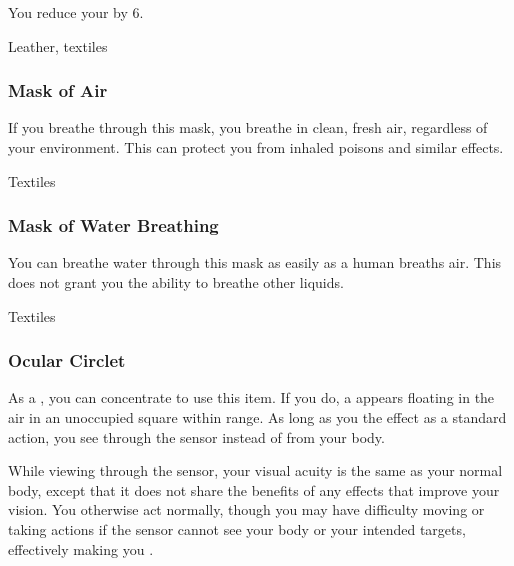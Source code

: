 You reduce your  by 6.



 


 Leather, textiles


\lowercase{\hypertarget{item:Mask of Air}{}}\label{item:Mask of Air}
\hypertarget{item:Mask of Air}{\subsubsection{Mask of Air\hfill{}}}

If you breathe through this mask, you breathe in clean, fresh air, regardless of your environment.
This can protect you from inhaled poisons and similar effects.



 Textiles


\lowercase{\hypertarget{item:Mask of Water Breathing}{}}\label{item:Mask of Water Breathing}
\hypertarget{item:Mask of Water Breathing}{\subsubsection{Mask of Water Breathing\hfill{}}}

You can breathe water through this mask as easily as a human breaths air.
This does not grant you the ability to breathe other liquids.



 Textiles


\lowercase{\hypertarget{item:Ocular Circlet}{}}\label{item:Ocular Circlet}
\hypertarget{item:Ocular Circlet}{\subsubsection{Ocular Circlet\hfill{}}}

As a , you can concentrate to use this item.
If you do, a  appears floating in the air in an unoccupied square within \rngclose range.
As long as you  the effect as a standard action, you see through the sensor instead of from your body.

While viewing through the sensor, your visual acuity is the same as your normal body,
except that it does not share the benefits of any  effects that improve your vision.
You otherwise act normally, though you may have difficulty moving or taking actions if the sensor cannot see your body or your intended targets, effectively making you \blinded.



